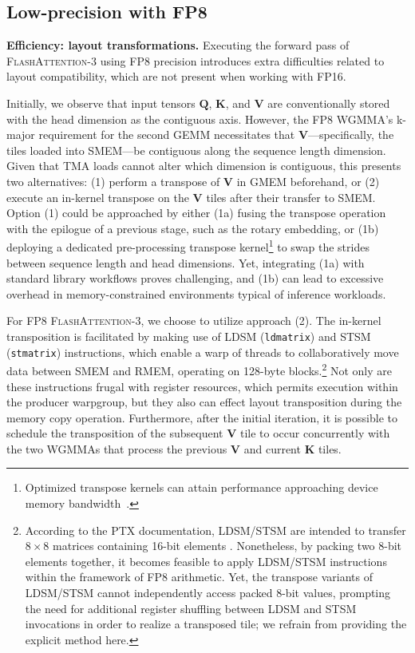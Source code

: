 \begin{algorithm}[H]
\begin{algorithmic}[1]
\subsection{Low-precision with FP8}
\label{sec:algofp8}

\textbf{Efficiency: layout transformations.} Executing the forward pass of \textsc{FlashAttention-3} using FP8 precision introduces extra difficulties related to layout compatibility, which are not present when working with FP16.

Initially, we observe that input tensors $\mathbf{Q}$, $\mathbf{K}$, and $\mathbf{V}$ are conventionally stored with the head dimension as the contiguous axis. However, the FP8 WGMMA's k-major requirement for the second GEMM necessitates that $\mathbf{V}$—specifically, the tiles loaded into SMEM—be contiguous along the sequence length dimension. Given that TMA loads cannot alter which dimension is contiguous, this presents two alternatives: (1) perform a transpose of $\mathbf{V}$ in GMEM beforehand, or (2) execute an in-kernel transpose on the $\mathbf{V}$ tiles after their transfer to SMEM. Option (1) could be approached by either (1a) fusing the transpose operation with the epilogue of a previous stage, such as the rotary embedding, or (1b) deploying a dedicated pre-processing transpose kernel\footnote{Optimized transpose kernels can attain performance approaching device memory bandwidth~\citep{colfax_cutlass_transpose_2024}.} to swap the strides between sequence length and head dimensions. Yet, integrating (1a) with standard library workflows proves challenging, and (1b) can lead to excessive overhead in memory-constrained environments typical of inference workloads.

For FP8 \textsc{FlashAttention-3}, we choose to utilize approach (2). The in-kernel transposition is facilitated by making use of LDSM (\verb|ldmatrix|) and STSM (\verb|stmatrix|) instructions, which enable a warp of threads to collaboratively move data between SMEM and RMEM, operating on 128-byte blocks.\footnote{According to the PTX documentation, LDSM/STSM are intended to transfer $8 \times 8$ matrices containing 16-bit elements \cite[\S 9.7.13.4.15-16]{ptx}. Nonetheless, by packing two 8-bit elements together, it becomes feasible to apply LDSM/STSM instructions within the framework of FP8 arithmetic. Yet, the transpose variants of LDSM/STSM cannot independently access packed 8-bit values, prompting the need for additional register shuffling between LDSM and STSM invocations in order to realize a transposed tile; we refrain from providing the explicit method here.} Not only are these instructions frugal with register resources, which permits execution within the producer warpgroup, but they also can effect layout transposition during the memory copy operation. Furthermore, after the initial iteration, it is possible to schedule the transposition of the subsequent $\mathbf{V}$ tile to occur concurrently with the two WGMMAs that process the previous $\mathbf{V}$ and current $\mathbf{K}$ tiles.


\end{algorithmic}
\end{algorithm}
